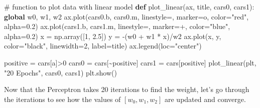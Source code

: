 \documentclass[
  letterpaper,
]{scrbook}
\newenvironment{Shaded}{\begin{snugshade}}{\end{snugshade}}
\newcommand{\CommentTok}[1]{\textcolor[rgb]{0.37,0.37,0.37}{#1}}
\newcommand{\DecValTok}[1]{\textcolor[rgb]{0.68,0.00,0.00}{#1}}
\newcommand{\FloatTok}[1]{\textcolor[rgb]{0.68,0.00,0.00}{#1}}
\newcommand{\KeywordTok}[1]{\textcolor[rgb]{0.00,0.23,0.31}{\textbf{#1}}}
\newcommand{\NormalTok}[1]{\textcolor[rgb]{0.00,0.23,0.31}{#1}}
\newcommand{\OperatorTok}[1]{\textcolor[rgb]{0.37,0.37,0.37}{#1}}
\newcommand{\StringTok}[1]{\textcolor[rgb]{0.13,0.47,0.30}{#1}}
\begin{document}
\begin{Shaded}
\begin{Highlighting}[]
\CommentTok{\# function to plot data with linear model}
\KeywordTok{def}\NormalTok{ plot\_linear(ax, title, cars0, cars1):}
    \KeywordTok{global}\NormalTok{ w0, w1, w2}
\NormalTok{    ax.plot(cars0.b, cars0.m, linestyle}\OperatorTok{=}\StringTok{\textquotesingle{}\textquotesingle{}}\NormalTok{, marker}\OperatorTok{=}\StringTok{\textquotesingle{}o\textquotesingle{}}\NormalTok{, }
\NormalTok{             color}\OperatorTok{=}\StringTok{"red"}\NormalTok{, alpha}\OperatorTok{=}\FloatTok{0.2}\NormalTok{)}
\NormalTok{    ax.plot(cars1.b, cars1.m, linestyle}\OperatorTok{=}\StringTok{\textquotesingle{}\textquotesingle{}}\NormalTok{, marker}\OperatorTok{=}\StringTok{\textquotesingle{}+\textquotesingle{}}\NormalTok{, }
\NormalTok{             color}\OperatorTok{=}\StringTok{"blue"}\NormalTok{, alpha}\OperatorTok{=}\FloatTok{0.2}\NormalTok{)}
\NormalTok{    x }\OperatorTok{=}\NormalTok{ np.array([}\DecValTok{1}\NormalTok{, }\FloatTok{2.5}\NormalTok{])}
\NormalTok{    y }\OperatorTok{=} \OperatorTok{{-}}\NormalTok{(w0 }\OperatorTok{+}\NormalTok{ w1 }\OperatorTok{*}\NormalTok{ x)}\OperatorTok{/}\NormalTok{w2}
\NormalTok{    ax.plot(x, y, color}\OperatorTok{=}\StringTok{"black"}\NormalTok{, linewidth}\OperatorTok{=}\DecValTok{2}\NormalTok{, label}\OperatorTok{=}\NormalTok{title)}
\NormalTok{    ax.legend(loc}\OperatorTok{=}\StringTok{"center"}\NormalTok{)}

\NormalTok{positive }\OperatorTok{=}\NormalTok{ cars[}\StringTok{\textquotesingle{}a\textquotesingle{}}\NormalTok{]}\OperatorTok{\textgreater{}}\DecValTok{0}
\NormalTok{cars0 }\OperatorTok{=}\NormalTok{ cars[}\OperatorTok{\textasciitilde{}}\NormalTok{positive]}
\NormalTok{cars1 }\OperatorTok{=}\NormalTok{ cars[positive]}
\NormalTok{plot\_linear(plt, }\StringTok{"20 Epochs"}\NormalTok{, cars0, cars1)}
\NormalTok{plt.show()}
\end{Highlighting}
\end{Shaded}

Now that the Perceptron takes 20 iterations to find the weight, let's go
through the iterations to see how the values of \([w_0, w_1, w_2]\) are
updated and converge.
\end{document}
